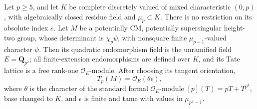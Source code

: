 \begin{lemma}
\label{lem:B-RD78-model}
Let \(p\ge5\), and let \(K\) be complete discretely valued
of mixed characteristic \((0,p)\), with algebraically closed
residue field and \(\mu_p\subset K\). There is no restriction
on its absolute index \(e\). Let \(M\) be a potentially CM,
potentially supersingular height-two group, whose determinant
is \(\chi_p\psi\), with nonsquare finite
\(\mu_{p-1}\)-valued character \(\psi\).
Then its quadratic endomorphism field is the unramified field
\(E=\mathbf Q_{p^2}\); all finite-extension endomorphisms are
defined over \(K\), and its Tate lattice is a free rank-one
\(\mathcal O_E\)-module. After choosing its tangent orientation,
\[
        T_p(M)=\mathcal O_E(\theta\epsilon),          \tag{B-RD78.1}
\]
where \(\theta\) is the character of the standard formal
\(\mathcal O_E\)-module \([p](T)=pT+T^{p^2}\), base changed
to \(K\), and \(\epsilon\) is finite and tame with values
in \(\mu_{p^2-1}\).
\end{lemma}

